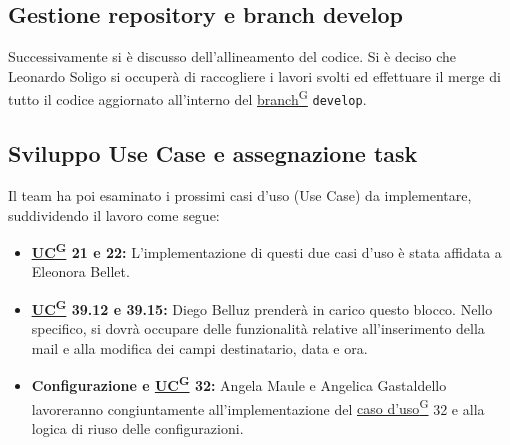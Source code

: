 \documentclass[a4paper,12pt]{article}
\providecommand{\glslink}[2]{\href{https://alittlebyte-19.github.io/Documentazione/glossario.html\#gls-#1}{\underline{#2}\textsuperscript{\scriptsize G}}}
\begin{document}
\subsection{Gestione repository e branch develop}
Successivamente si è discusso dell'allineamento del codice. Si è deciso che Leonardo Soligo si occuperà di raccogliere i lavori svolti ed effettuare il merge di tutto il codice aggiornato all'interno del \glslink{branch}{branch} \texttt{develop}.

\subsection{Sviluppo Use Case e assegnazione task}
Il team ha poi esaminato i prossimi casi d'uso (Use Case) da implementare, suddividendo il lavoro come segue:
\begin{itemize}
    \item \textbf{\glslink{caso-d-uso-uc}{UC} 21 e 22:} L'implementazione di questi due casi d'uso è stata affidata a Eleonora Bellet.
    \item \textbf{\glslink{caso-d-uso-uc}{UC} 39.12 e 39.15:} Diego Belluz prenderà in carico questo blocco. Nello specifico, si dovrà occupare delle funzionalità relative all'inserimento della mail e alla modifica dei campi destinatario, data e ora.
    \item \textbf{Configurazione e \glslink{caso-d-uso-uc}{UC} 32:} Angela Maule e Angelica Gastaldello lavoreranno congiuntamente all'implementazione del \glslink{caso-d-uso-uc}{caso d'uso} 32 e alla logica di riuso delle configurazioni.
\end{itemize}


\newpage
\end{document}
